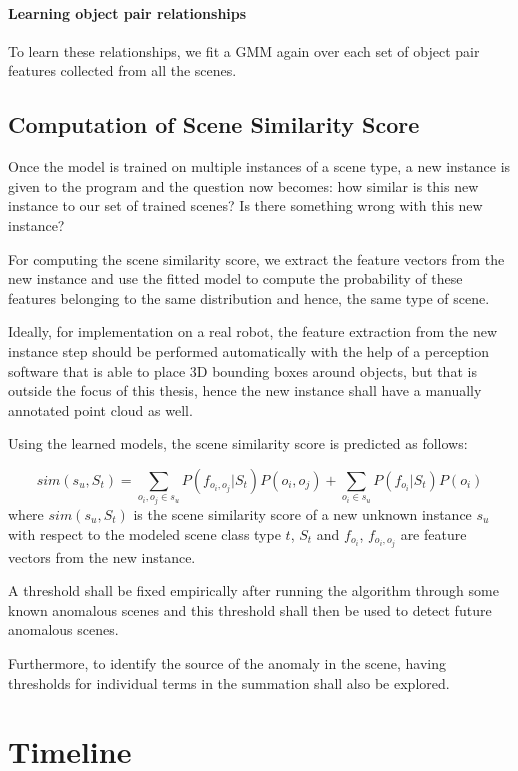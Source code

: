 \documentclass[12pt]{article}
\begin{document}
\paragraph{Learning object pair relationships}

To learn these relationships, we fit a GMM again over each set of object pair features collected from all the scenes.


\subsection{Computation of Scene Similarity Score}

Once the model is trained on multiple instances of a scene type, a new instance is given to the program and the question now becomes: how similar is this new instance to our set of trained scenes? Is there something wrong with this new instance? 

For computing the scene similarity score, we extract the feature vectors from the new instance and use the fitted model to compute the probability of these features belonging to the same distribution and hence, the same type of scene. 

Ideally, for implementation on a real robot, the feature extraction from the new instance step should be performed automatically with the help of a perception software that is able to place 3D bounding boxes around objects, but that is outside the focus of this thesis, hence the new instance shall have a manually annotated point cloud as well.

Using the learned models, the scene similarity score is predicted as follows:

\[sim(s_u, S_t) = \sum_{o_i, o_j \in s_u} P(f_{o_i, o_j}|S_t)P(o_i, o_j) + 
\sum_{o_i \in s_u} P(f_{o_i}|S_t)P(o_i)\]
where $sim(s_u, S_t)$ is the scene similarity score of a new unknown instance $s_u$ with respect to the modeled scene class type $t$, $S_t$ and $f_{o_i}$, $f_{o_i, o_j}$ are feature vectors from the new instance. 

A threshold shall be fixed empirically after running the algorithm through some known anomalous scenes and this threshold shall then be used to detect future anomalous scenes.

Furthermore, to identify the source of the anomaly in the scene, having thresholds for individual terms in the summation shall also be explored.


\section{Timeline}
\end{document}
